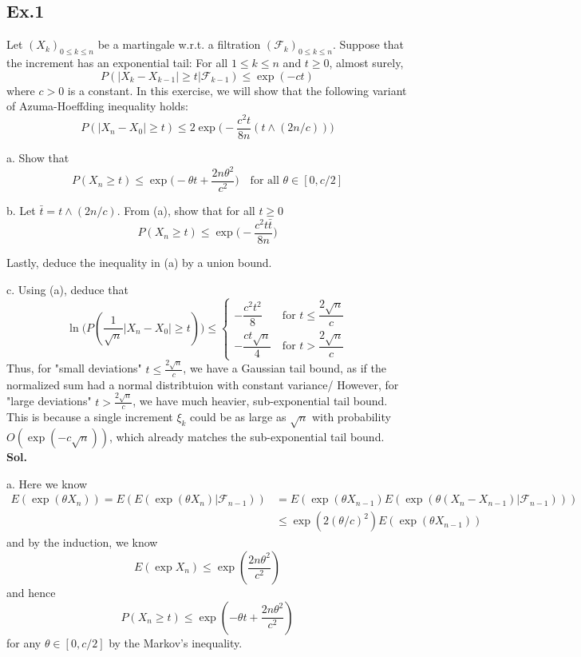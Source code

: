 \documentclass[lang=en,11pt,a4paper,citestyle =authoryear]{elegantpaper}
\newcommand{\F}{\mathcal{F}}
\begin{document}
\subsection*{Ex.1} 
Let $(X_k)_{0\leq k \leq n}$ be a martingale w.r.t. a filtration $(\F_k)_{0\leq k\leq n}$. Suppose that the increment has an exponential tail: For all $1\leq k \leq n$ and $t \geq 0$, almost surely,
\[P(|X_k-X_{k-1}|\geq t|\F_{k-1}) \leq \exp{(-ct)}\]
where $c>0$ is a constant. In this exercise, we will show that the following variant of Azuma-Hoeffding inequality holds:
\[P(|X_n-X_0|\geq t)\leq 2\exp\Big(-\dfrac{c^2 t}{8n}(t\wedge (2n/c))\Big)\]\par
a. Show that
\[P(X_n\geq t) \leq \exp\Big(-\theta t+\dfrac{2n\theta^2}{c^2}\Big)\quad\text{for all }\theta\in[0,c/2]\]\par
b. Let $\bar{t} = t\wedge (2n/c)$. From (a), show that for all $t\geq 0$
\[P(X_n\geq t) \leq \exp\Big(-\dfrac{c^2t\bar{t}}{8n}\Big)\]\par
Lastly, deduce the inequality in (a) by a union bound.\par
c. Using (a), deduce that
\[\ln\Big(P(\dfrac{1}{\sqrt{n}}|X_n-X_0| \geq t)\Big) \leq \begin{cases}
    -\dfrac{c^2t^2}{8}\quad&\text{for }t\leq\dfrac{2\sqrt{n}}{c} \\
    -\dfrac{ct\sqrt{n}}{4}&\text{for }t>\dfrac{2\sqrt{n}}{c}
\end{cases}\]
Thus, for "small deviations" $t\leq \tfrac{2\sqrt{n}}{c}$, we have a Gaussian tail bound, as if the normalized sum had a normal distribtuion with constant variance/ However, for "large deviations" $t>\tfrac{2\sqrt{n}}{c}$, we have much heavier, sub-exponential tail bound. This is because a single increment $\xi_k$ could be as large as $\sqrt{n}$ with probability $O(\exp{(-c\sqrt{n})})$, which already matches the sub-exponential tail bound.
\vspace{0.5em}\\
\textbf{Sol.} \par
a. Here we know
\[
\begin{aligned}
E(\exp(\theta X_n)) = E(E(\exp(\theta X_{n})|\F_{n-1})) &= E(\exp(\theta X_{n-1})E(\exp(\theta(X_{n}-X_{n-1})|\F_{n-1}))) \\
& \leq \exp(2(\theta/c)^2)E(\exp(\theta X_{n-1}))
\end{aligned}
\]
and by the induction, we know
\[
E(\exp X_n) \leq \exp(\dfrac{2n\theta^2}{c^2})
\]
and hence
\[
P(X_n \geq t) \leq  \exp(-\theta t +\dfrac{2n\theta^2}{c^2})
\]
for any $\theta \in [0,c/2]$ by the Markov's inequality.\par
\end{document}
